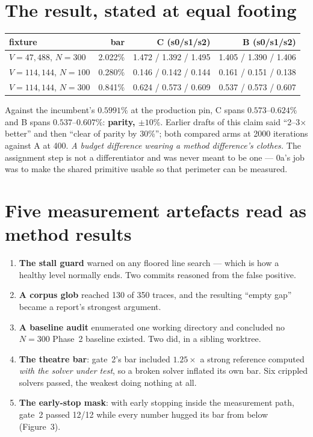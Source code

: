 \documentclass[11pt,a4paper]{article}
\begin{document}
\section{The result, stated at equal footing}

\begin{center}\small
\begin{tabular}{@{}lrrr@{}}
\toprule
fixture & bar & C (s0/s1/s2) & B (s0/s1/s2) \\
\midrule
\(V{=}47{,}488\), \(N{=}300\)  & 2.022\% & 1.472 / 1.392 / 1.495 & 1.405 / 1.390 / 1.406 \\
\(V{=}114{,}144\), \(N{=}100\) & 0.280\% & 0.146 / 0.142 / 0.144 & 0.161 / 0.151 / 0.138 \\
\(V{=}114{,}144\), \(N{=}300\) & 0.841\% & 0.624 / 0.573 / 0.609 & 0.537 / 0.573 / 0.607 \\
\bottomrule
\end{tabular}
\end{center}

Against the incumbent's \(0.5991\%\) at the production pin, C spans
\(0.573\text{--}0.624\%\) and B spans \(0.537\text{--}0.607\%\):
\textbf{parity, \(\pm 10\%\)}. Earlier drafts of this claim said ``2--3\(\times\)
better'' and then ``clear of parity by 30\%''; both compared arms at 2000
iterations against A at 400. \emph{A budget difference wearing a method
difference's clothes.} The assignment step is not a differentiator and was never
meant to be one --- 0a's job was to make the shared primitive usable so that
perimeter can be measured.

\section{Five measurement artefacts read as method results}

\begin{enumerate}\itemsep2pt
\item \textbf{The stall guard} warned on any floored line search --- which is how
  a healthy level normally ends. Two commits reasoned from the false positive.
\item \textbf{A corpus glob} reached 130 of 350 traces, and the resulting
  ``empty gap'' became a report's strongest argument.
\item \textbf{A baseline audit} enumerated one working directory and concluded no
  \(N{=}300\) Phase~2 baseline existed. Two did, in a sibling worktree.
\item \textbf{The theatre bar}: gate~2's bar included \(1.25\times\) a strong
  reference computed \emph{with the solver under test}, so a broken solver
  inflated its own bar. Six crippled solvers passed, the weakest doing nothing at
  all.
\item \textbf{The early-stop mask}: with early stopping inside the measurement
  path, gate~2 passed 12/12 while every number hugged its bar from below
  (Figure~3).
\end{enumerate}
\end{document}
